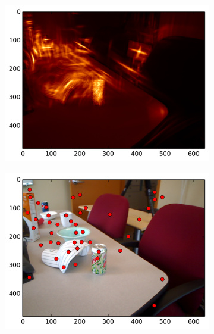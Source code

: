 \begin{figure}[ht]
\begin{subfigure}[]{0.25\linewidth}\label{fig:meet_smag_0}\includegraphics[width=\linewidth]{figures/meeting_smag_1}\end{subfigure}%
\begin{subfigure}[]{0.25\linewidth}\label{fig:meet_feats_0}\includegraphics[width=\linewidth]{figures/meeting_feats_1}\end{subfigure}\\

\end{figure}
